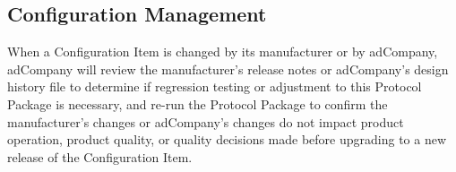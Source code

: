 \subsection{Configuration Management}
When a Configuration Item is changed by its manufacturer or by adCompany, adCompany will
review the manufacturer's release notes or adCompany's design history file to
determine if regression testing or adjustment to this Protocol Package is
necessary, and re-run the Protocol Package to confirm the manufacturer's changes
or adCompany's changes do not impact product operation, product quality, or quality
decisions made before upgrading to a new release of the Configuration Item.
